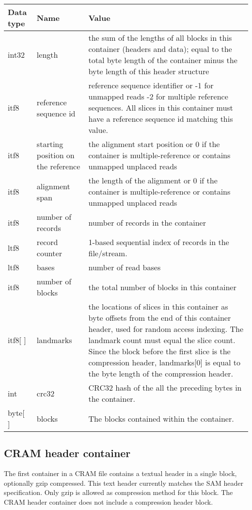 \documentclass[a4paper]{article}
\begin{document}
\begin{tabular}{|l|>{\raggedright}p{120pt}|>{\raggedright}p{260pt}|}
\hline
\textbf{Data type} & \textbf{Name} & \textbf{Value}
\tabularnewline
\hline
int32 & length & the sum of the lengths of all blocks in this container (headers and data); 
equal to the total byte length of the container minus the byte length of this header structure\tabularnewline
\hline
itf8 & reference sequence id & reference sequence identifier  or\linebreak{}
-1 for unmapped reads\linebreak{}
-2 for multiple reference sequences.\linebreak{}
All slices in this container must have a reference sequence id matching this value.\tabularnewline
\hline
itf8 & starting position on the reference & the alignment start position or\linebreak{}
0 if the container is multiple-reference
or contains unmapped unplaced reads\tabularnewline
\hline
itf8 & alignment span & the length of the alignment or\linebreak{}
0 if the container is multiple-reference
or contains unmapped unplaced reads\tabularnewline
\hline
itf8 & number of records & number of records in the container\tabularnewline
\hline
ltf8 & record counter & 1-based sequential index of records in the file/stream.\tabularnewline
\hline
ltf8 & bases & number of read bases\tabularnewline
\hline
itf8 & number of blocks & the total number of blocks in this container\tabularnewline
\hline
itf8[ ] & landmarks & the locations of slices in this container as byte offsets from the end of 
this container header, used for random access indexing.
The landmark count must equal the slice count.\linebreak{}
Since the block before the first slice is the compression header,
landmarks[0] is equal to the byte length of the compression header.\tabularnewline
\hline
int & crc32 & CRC32 hash of the all the preceding bytes in the container.\tabularnewline
\hline
byte[ ] & blocks & The blocks contained within the container.\tabularnewline
\hline
\end{tabular}

\subsection{\textbf{CRAM header container}}

The first container in a CRAM file contains a textual header in a single block, optionally
gzip compressed. This text header currently matches the SAM header specification. Only
gzip is allowed as compression method for this block. The CRAM header container does not
include a compression header block.
\end{document}
